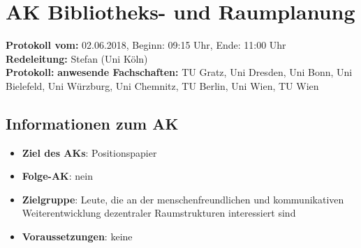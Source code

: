 
\section{AK Bibliotheks- und Raumplanung}

  \textbf{Protokoll vom:} 02.06.2018, %
  Beginn: 09:15 Uhr,
  Ende: 11:00 Uhr \\
  \textbf{Redeleitung:} Stefan (Uni Köln) \\ %
  \textbf{Protokoll:} %
  \textbf{anwesende Fachschaften:} TU Gratz, Uni Dresden, Uni Bonn, Uni Bielefeld, Uni Würzburg, Uni Chemnitz, TU Berlin, Uni Wien, TU Wien

  \subsection*{Informationen zum AK}
    \begin{itemize}
      \item \textbf{Ziel des AKs}: Positionspapier
      \item \textbf{Folge-AK}: nein
      \item \textbf{Zielgruppe}: Leute, die an der menschenfreundlichen und kommunikativen Weiterentwicklung dezentraler Raumstrukturen interessiert sind
      \item \textbf{Voraussetzungen}: keine
    \end{itemize}

